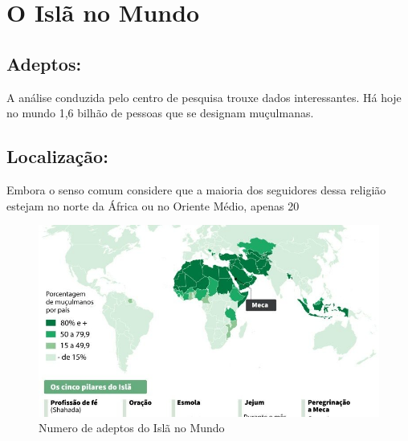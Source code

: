 \documentclass[12pt]{article}
\begin{document}
\section{O Islã no Mundo}
 \subsection{Adeptos:}
 A análise conduzida pelo centro de pesquisa trouxe dados interessantes. Há hoje no mundo 1,6 bilhão de pessoas que se designam muçulmanas.
 \subsection{Localização:}
 Embora o senso comum considere que a maioria dos seguidores dessa religião estejam no norte da África ou no Oriente Médio, apenas 20%

 \begin{figure}[ht]
    \setlength{\abovecaptionskip}{5pt}
    \setlength{\belowcaptionskip}{0pt}
    \caption[Numero de adeptos do Islã no Mundo]
        {Numero de adeptos do Islã no Mundo}
    \centering
    \includegraphics[width=1.10\textwidth]{mundo_isla.png}
    \captionsetup[grafico]{justification=centering}
    \end{figure}
\end{document}
